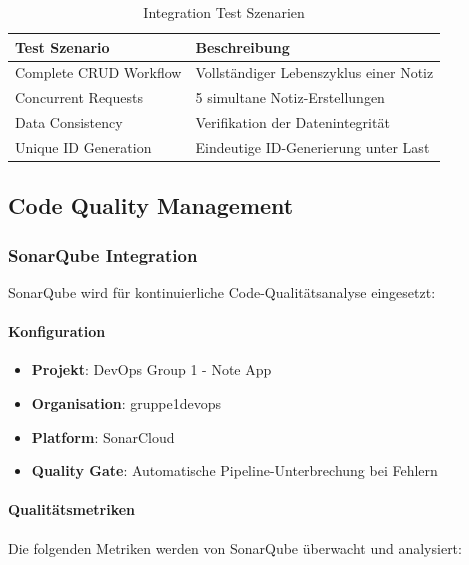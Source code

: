 \begin{table}[h!]
    \centering
    \caption{Integration Test Szenarien}
    \label{tab:integration-tests}
    \begin{tabular}{|l|l|}
    \hline
    \textbf{Test Szenario} & \textbf{Beschreibung} \\ \hline
    Complete CRUD Workflow & Vollständiger Lebenszyklus einer Notiz \\ \hline
    Concurrent Requests & 5 simultane Notiz-Erstellungen \\ \hline
    Data Consistency & Verifikation der Datenintegrität \\ \hline
    Unique ID Generation & Eindeutige ID-Generierung unter Last \\ \hline
    \end{tabular}
\end{table}

\subsection{Code Quality Management}

\subsubsection{SonarQube Integration}
SonarQube wird für kontinuierliche Code-Qualitätsanalyse eingesetzt:

\paragraph{Konfiguration}
\begin{itemize}
    \item \textbf{Projekt}: DevOps Group 1 - Note App
    \item \textbf{Organisation}: gruppe1devops
    \item \textbf{Platform}: SonarCloud
    \item \textbf{Quality Gate}: Automatische Pipeline-Unterbrechung bei Fehlern
\end{itemize}


\paragraph{Qualitätsmetriken}
Die folgenden Metriken werden von SonarQube überwacht und analysiert:


